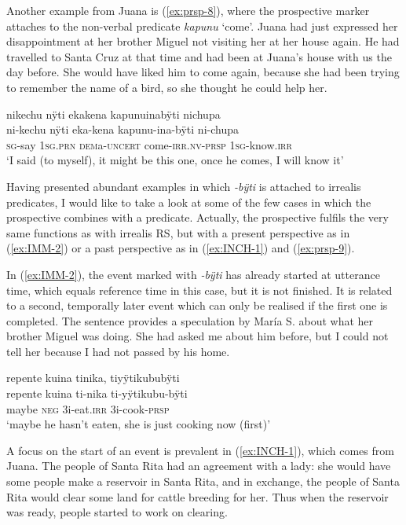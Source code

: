 Another example from Juana is (\ref{ex:prsp-8}), where the prospective marker attaches to the non-verbal predicate \textit{kapunu} ‘come’. Juana had just expressed her disappointment at her brother Miguel not visiting her at her house again. He had travelled to Santa Cruz at that time and had been at Juana’s house with us the day before. She would have liked him to come again, because she had been trying to remember the name of a bird, so she thought he could help her.

\ea\label{ex:prsp-8}
\begingl
\glpreamble nikechu nÿti ekakena kapunuinabÿti nichupa\\
\gla ni-kechu nÿti eka-kena kapunu-ina-bÿti ni-chupa\\
\textsc{sg}-say 1\textsc{sg.prn} \textsc{dem}a-\textsc{uncert} come-\textsc{irr.nv}-\textsc{prsp} 1\textsc{sg}-know.\textsc{irr}\\
\glft ‘I said (to myself), it might be this one, once he comes, I will know it’
\endgl
\trailingcitation{[jxx-p120430l-1.093]}
\xe


Having presented abundant examples in which \textit{-bÿti} is attached to irrealis predicates, I would like to take a look at some of the few cases in which the prospective combines with a  predicate. Actually, the prospective fulfils the very same functions as with irrealis RS, but with a present perspective as in (\ref{ex:IMM-2}) or a past perspective as in (\ref{ex:INCH-1}) and (\ref{ex:prsp-9}).

In (\ref{ex:IMM-2}), the event marked with \textit{-bÿti} has already started at utterance time, which equals reference time in this case, but it is not finished. It is related to a second, temporally later event which can only be realised if the first one is completed.  The sentence provides a speculation by María S. about what her brother Miguel was doing. She had asked me about him before, but I could not tell her because I had not passed by his home.

\ea\label{ex:IMM-2}
\begingl 
\glpreamble repente kuina tinika, tiyÿtikububÿti \\
\gla repente kuina ti-nika ti-yÿtikubu-bÿti \\ 
\glb maybe \textsc{neg} 3i-eat.\textsc{irr} 3i-cook-\textsc{prsp}\\ 
\glft ‘maybe he hasn’t eaten, she is just cooking now (first)’\\ 
\endgl
\trailingcitation{[rxx-e120511l.339]}
\xe

A focus on the start of an event is prevalent in (\ref{ex:INCH-1}), which comes from Juana. The people of Santa Rita had an agreement with a lady: she would have some people make a reservoir in Santa Rita, and in exchange, the people of Santa Rita would clear some land for cattle breeding for her. Thus when the reservoir was ready, people started to work on clearing.


